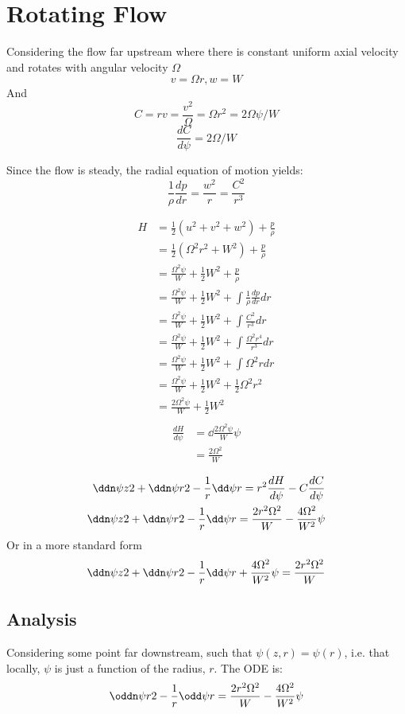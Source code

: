 \documentclass{X:/Documents/Coding/Latex/myreport}
\begin{document}
\section{Rotating Flow}
Considering the flow far upstream where there is constant uniform axial velocity and rotates with angular velocity $\Omega$ 
\[v = \Omega r, w =W\]
And
\[C = rv =  \frac{v^2}{\Omega} = \Omega r^2 = 2\Omega \psi/W \]
\[\frac{dC}{d\psi} = 2\Omega/W\]

Since the flow is steady, the radial equation of motion yields:
\[\frac1\rho \frac{dp}{dr} = \frac{w^2}{r} = \frac{C^2}{r^3}\]

\begin{align*}
H &= \frac12 (u^2 + v^2 + w^2) + \frac p\rho\\
&=\frac12 (\Omega^2r^2 + W^2) + \frac p\rho   \\
&=\frac{\Omega^2 \psi}{W} + \frac12 W^2 + \frac p\rho\\
&=\frac{\Omega^2 \psi}{W} + \frac12 W^2 +  \int \frac1\rho\frac{dp}{dr} dr\\
&=\frac{\Omega^2 \psi}{W} + \frac12 W^2 +  \int \frac{C^2}{r^3} dr\\
&=\frac{\Omega^2 \psi}{W} + \frac12 W^2 +  \int \frac{\Omega^2 r^4}{r^3} dr\\
&=\frac{\Omega^2 \psi}{W} + \frac12 W^2 +  \int \Omega^2 r dr\\
&=\frac{\Omega^2 \psi}{W} + \frac12 W^2 +  \frac12 \Omega^2 r^2 \\
&=\frac{2\Omega^2 \psi}{W} + \frac12 W^2 \\
\end{align*}
\begin{align*}
\frac{dH}{d\psi} &=\dd{\frac{2\Omega^2 \psi}{W}}{\psi}\\
&=  \frac{2\Omega^2}{W}    
\end{align*}


\begin{align*}
    \ddn \psi z 2 + \ddn \psi r2 - \frac1r \dd\psi r= r^2 \frac{dH}{d\psi} - C\frac{dC}{d\psi}\\
    \ddn \psi z 2 + \ddn \psi r2 - \frac1r \dd\psi r= \frac{2 r^2 \Omega^2}{W} - \frac{4\Omega^2}{W^2}\psi\\
\end{align*}
Or in a more standard form
\[\ddn \psi z 2 + \ddn \psi r2 - \frac1r \dd\psi r + \frac{4\Omega^2}{W^2}\psi= \frac{2 r^2 \Omega^2}{W} \]



\clearpage
\subsection{Analysis}
Considering some point far downstream, such that $\psi(z,r) = \psi(r)$, i.e. that locally, $\psi$ is just a function of the radius, $r$. 
The ODE is:
\[\oddn \psi r2 - \frac1r \odd\psi r= \frac{2 r^2 \Omega^2}{W} - \frac{4\Omega^2}{W^2}\psi \]
\end{document}

